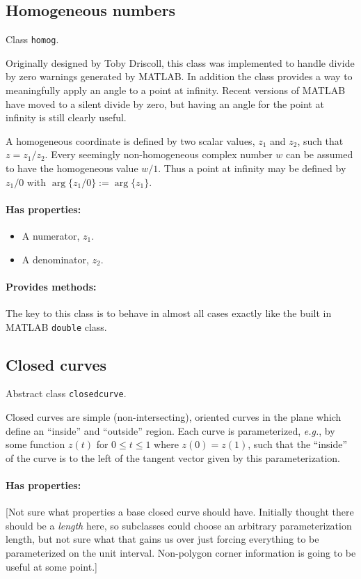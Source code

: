 \documentclass[12pt]{article}
\begin{document}
\subsection{Homogeneous numbers}
Class \verb+homog+.

Originally designed by Toby Driscoll, this class was implemented to handle divide by zero warnings generated by MATLAB. In addition the class provides a way to meaningfully apply an angle to a point at infinity. Recent versions of MATLAB have moved to a silent divide by zero, but having an angle for the point at infinity is still clearly useful.

A homogeneous coordinate is defined by two scalar values, $z_1$ and $z_2$, such that $z = z_1/z_2$. Every seemingly non-homogeneous complex number $w$ can be assumed to have the homogeneous value $w/1$. Thus a point at infinity may be defined by $z_1/0$ with $\arg\{z_1/0\} := \arg\{z_1\}$.

\paragraph{Has properties:}
\begin{itemize}
  \item A numerator, $z_1$.
  \item A denominator, $z_2$.
\end{itemize}

\paragraph{Provides methods:}
The key to this class is to behave in almost all cases exactly like the built in MATLAB \verb+double+ class.

\subsection{Closed curves}
Abstract class \verb+closedcurve+.

Closed curves are simple (non-intersecting), oriented curves in the plane which define an ``inside'' and ``outside'' region. Each curve is parameterized, \textit{e.g.}, by some function $z(t)$ for $0\le t\le 1$ where $z(0) = z(1)$, such that the ``inside'' of the curve is to the left of the tangent vector given by this parameterization.

\paragraph{Has properties:} [Not sure what properties a base closed curve should have. Initially thought there should be a \emph{length} here, so subclasses could choose an arbitrary parameterization length, but not sure what that gains us over just forcing everything to be parameterized on the unit interval. Non-polygon corner information is going to be useful at some point.]
\end{document}

